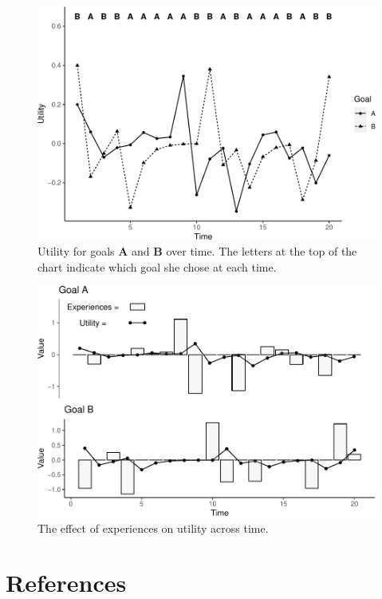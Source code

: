 \documentclass[english,,man]{apa6}
\theoremstyle{definition}
\theoremstyle{definition}
\theoremstyle{definition}
\theoremstyle{remark}
\begin{document}
\begin{figure}
\centering
\includegraphics{figures/Figure1-1.pdf}
\caption{\label{fig:Figure1}Utility for goals \textbf{A} and \textbf{B} over
time. The letters at the top of the chart indicate which goal she chose
at each time.}
\end{figure}

\begin{figure}
\centering
\includegraphics{figures/Figure2-1.pdf}
\caption{\label{fig:Figure2}The effect of experiences on utility across
time.}
\end{figure}

\newpage

\hypertarget{references}{%
\section{References}\label{references}}
\end{document}

